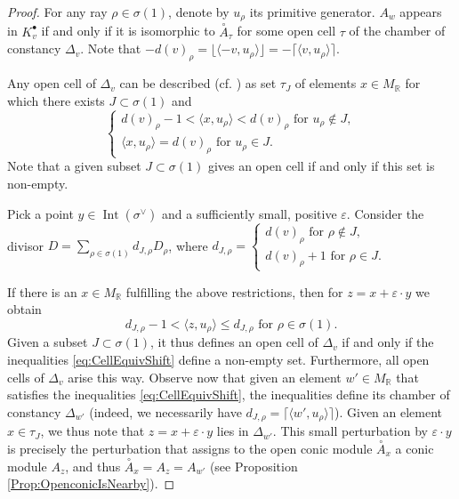 \documentclass[reqno, 12pt]{amsart}
\theoremstyle{definition}
\numberwithin{equation}{section}
\newcommand{\R}{\mathbb{R}}
\newcommand{\opA}{\overset{\circ}{A}}
\begin{document}
\begin{proof}
For any ray $\rho\in \sigma(1)$, denote by $u_\rho$ its primitive generator.
    $A_w$ appears in $K_v^\bullet$ if and only if it is isomorphic to $\opA_{\tau}$ for some open cell $\tau$ of the chamber of constancy $\Delta_v$. Note that $-d(v)_\rho=\lfloor \langle -v,u_\rho\rangle\rfloor=-\lceil\langle v,u_\rho\rangle\rceil$.

    Any open cell of $\Delta_v$ can be described (cf. \cite[Proposition 4.6]{FMS19}) as set $\tau_J$ of elements
    $x\in M_\R$ for which there exists $J\subset\sigma(1)$ and \begin{equation}
    \label{eq:FacetConditionPf}
    \begin{cases}
          d(v)_\rho-1 <\langle x, u_\rho\rangle <d(v)_\rho \text{ for } u_\rho\not\in J, \\
          \langle x,u_\rho\rangle = d(v)_\rho\text{ for } u_\rho\in J.
    \end{cases}
    \end{equation}
    Note that a given subset $J\subset \sigma(1)$ gives an open cell if and only if this set is non-empty. 

    Pick a point $y\in \operatorname{Int}(\sigma^\vee)$ and a sufficiently small, positive $\varepsilon$. Consider the divisor $D=\sum_{\rho\in \sigma(1)} d_{J,\rho} D_\rho$, where $d_{J,\rho}=\begin{cases}
        d(v)_\rho\text{ for }\rho\not\in J,\\
        d(v)_\rho +1\text{ for } \rho\in J.
    \end{cases}$
    
\noindent If there is an $x\in M_\R$ fulfilling the above restrictions, then for $z=x+\varepsilon \cdot y$  we obtain\begin{equation}
    \label{eq:CellEquivShift}
        d_{J,\rho} -1 <\langle z,u_\rho\rangle \le d_{J,\rho}\text{ for }\rho\in \sigma(1).
    \end{equation}
    Given a subset $J\subset \sigma(1)$, it thus defines an open cell of $\Delta_v$ if and only if the inequalities \eqref{eq:CellEquivShift} define a non-empty set. Furthermore, all open cells of $\Delta_v$ arise this way. Observe now that given an element $w'\in M_\R$ that satisfies the inequalities \eqref{eq:CellEquivShift}, the inequalities define its chamber of constancy $\Delta_{w'}$ (indeed, we necessarily have $d_{J,\rho}=\lceil\langle w',u_\rho\rangle \rceil$). Given an element $x\in \tau_J$, we thus note that $z=x+\varepsilon\cdot y$ lies in $\Delta_{w'}$. This small perturbation by $\varepsilon\cdot y$ is precisely the perturbation that assigns to the open conic module $\opA_{x}$ a conic module $A_{z}$, and thus $\opA_{x}=A_z=A_{w'}$ (see Proposition \ref{Prop:OpenconicIsNearby}).


\end{proof}
\end{document}
